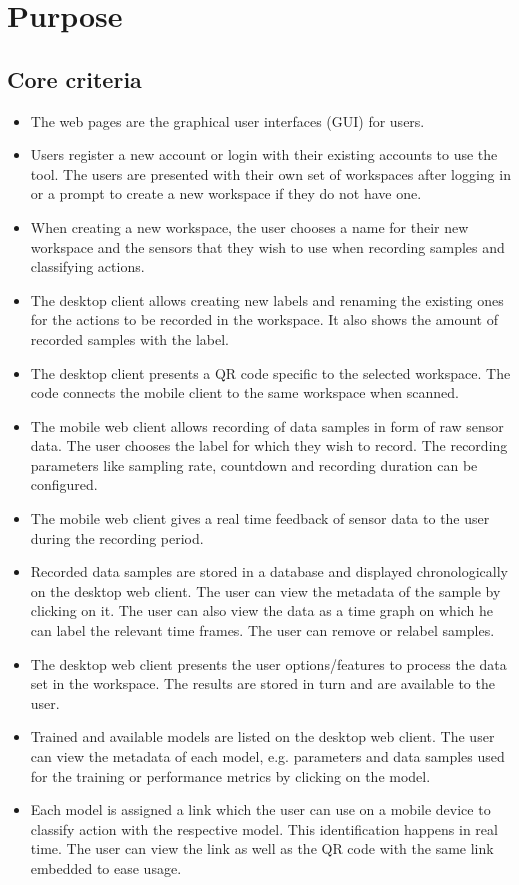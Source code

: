 \section{Purpose}

\subsection{Core criteria}
\begin{itemize}
    \item The web pages are the graphical user interfaces (GUI) for users.
    \item Users register a new account or login with their existing accounts to use the tool. The users are presented with their own set of workspaces after logging in or a prompt to create a new workspace if they do not have one.
    \item When creating a new workspace, the user chooses a name for their new workspace and the sensors that they wish to use when recording samples and classifying actions. %
    \item The desktop client allows creating new labels and renaming the existing ones for the actions to be recorded in the workspace. It also shows the amount of recorded samples with the label. 
    \item The desktop client presents a QR code specific to the selected workspace. The code connects the mobile client to the same \gls{workspace} when scanned.
    \item The mobile web client allows recording of data samples in form of raw sensor data. The user chooses the label for which they wish to record. The recording parameters like sampling rate, countdown and recording duration can be configured.
    \item The mobile web client gives a real time feedback of sensor data to the user during the recording period.
    \item Recorded data samples are stored in a database and displayed chronologically on the desktop web client. The user can view the metadata of the sample by clicking on it. The user can also view the data as a time graph on which he can label the relevant time frames. The user can remove or relabel samples.
    \item The desktop web client presents the user options/features to process the data set in the workspace. The results are stored in turn and are available to the user. %
    \item Trained and available models are listed on the desktop web client. The user can view the metadata of each model, e.g. parameters and data samples used for the training or performance metrics by clicking on the model.
    \item Each model is assigned a link which the user can use on a mobile device to classify action with the respective model. This identification happens in real time. The user can view the link as well as the QR code with the same link embedded to ease usage.
\end{itemize}

